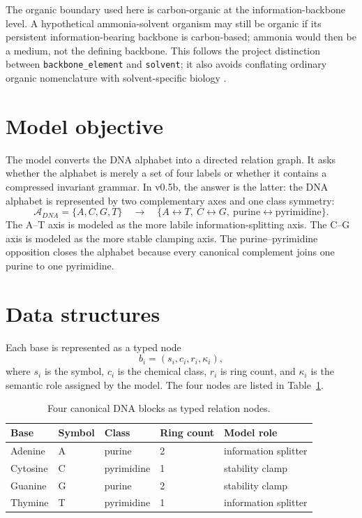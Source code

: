 \documentclass[11pt]{article}
\begin{document}
The organic boundary used here is carbon-organic at the information-backbone level. A hypothetical ammonia-solvent organism may still be organic if its persistent information-bearing backbone is carbon-based; ammonia would then be a medium, not the defining backbone. This follows the project distinction between \texttt{backbone\_element} and \texttt{solvent}; it also avoids conflating ordinary organic nomenclature with solvent-specific biology \cite{IUPACFunctionalGroup,IUPACBlueBookOrganic}.

\section{Model objective}
The model converts the DNA alphabet into a directed relation graph. It asks whether the alphabet is merely a set of four labels or whether it contains a compressed invariant grammar. In v0.5b, the answer is the latter: the DNA alphabet is represented by two complementary axes and one class symmetry:
\[
  \mathcal{A}_{DNA}=\{A,C,G,T\}\quad\longrightarrow\quad
  \{A\leftrightarrow T,\ C\leftrightarrow G,\ \mathrm{purine}\leftrightarrow\mathrm{pyrimidine}\}.
\]
The A--T axis is modeled as the more labile information-splitting axis. The C--G axis is modeled as the more stable clamping axis. The purine--pyrimidine opposition closes the alphabet because every canonical complement joins one purine to one pyrimidine.

\section{Data structures}
Each base is represented as a typed node
\[
  b_i=(s_i,c_i,r_i,\kappa_i),
\]
where $s_i$ is the symbol, $c_i$ is the chemical class, $r_i$ is ring count, and $\kappa_i$ is the semantic role assigned by the model. The four nodes are listed in Table~\ref{tab:bases}.

\begin{table}[h]
\centering
\caption{Four canonical DNA blocks as typed relation nodes.}
\label{tab:bases}
\begin{tabular}{lllll}
\toprule
Base & Symbol & Class & Ring count & Model role \\
\midrule
Adenine & A & purine & 2 & information splitter \\
Cytosine & C & pyrimidine & 1 & stability clamp \\
Guanine & G & purine & 2 & stability clamp \\
Thymine & T & pyrimidine & 1 & information splitter \\
\bottomrule
\end{tabular}
\end{table}
\end{document}
